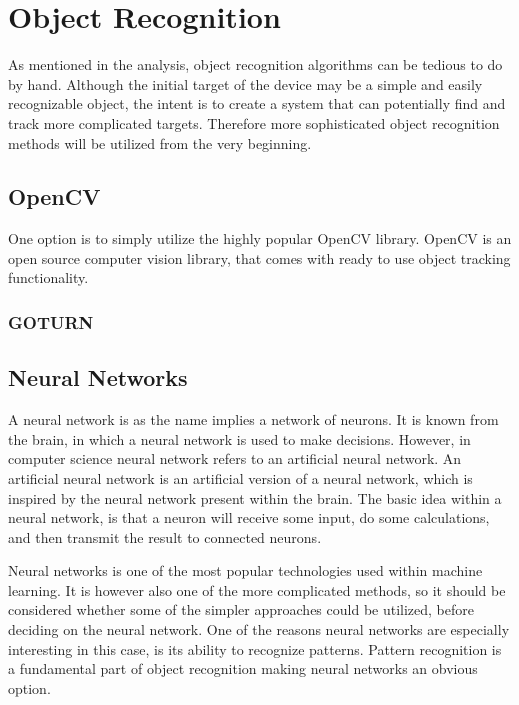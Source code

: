 \section{Object Recognition}
As mentioned in the analysis, object recognition algorithms can be tedious to do by hand.
Although the initial target of the device may be a simple and easily recognizable object, the intent is to create a system that can potentially find and track more complicated targets.
Therefore more sophisticated object recognition methods will be utilized from the very beginning.

\subsection{OpenCV}
One option is to simply utilize the highly popular OpenCV library.
OpenCV is an open source computer vision library, that comes with ready to use object tracking functionality.

\subsubsection{GOTURN}


\subsection{Neural Networks}

A neural network is as the name implies a network of neurons.
It is known from the brain, in which a neural network is used to make decisions.
However, in computer science neural network refers to an artificial neural network.
An artificial neural network is an artificial version of a neural network, which is inspired by the neural network present within the brain.
The basic idea within a neural network, is that a neuron will receive some input, do some calculations, and then transmit the result to connected neurons.

Neural networks is one of the most popular technologies used within machine learning.
It is however also one of the more complicated methods, so it should be considered whether some of the simpler approaches could be utilized, before deciding on the neural network.
One of the reasons neural networks are especially interesting in this case, is its ability to recognize patterns.
Pattern recognition is a fundamental part of object recognition making neural networks an obvious option.


